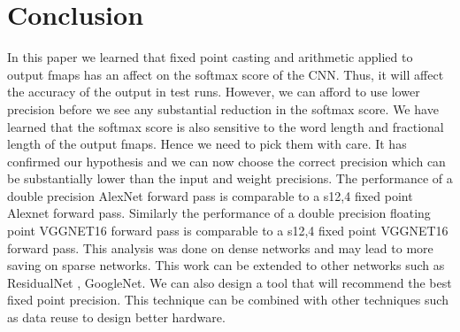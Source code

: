 \documentclass[conference]{IEEEtran}
\begin{document}


\section{Conclusion}
In this paper we learned that fixed point casting and arithmetic applied to output fmaps has an affect on the softmax score of the CNN. Thus, it will affect the accuracy of the output in test runs. However, we can afford to use lower precision before we see any substantial reduction in the softmax score. We have learned that the softmax score is also sensitive to the word length and fractional length of the output fmaps. Hence we need to pick them with care. It has confirmed our hypothesis and we can now choose the correct precision which can be substantially lower than the input and weight precisions. The performance of a double precision AlexNet forward pass is comparable to a s12,4 fixed point Alexnet forward pass. Similarly the performance of a double precision floating point VGGNET16 forward pass is comparable to a s12,4 fixed point VGGNET16 forward pass.
This analysis was done on dense networks and may lead to more saving on sparse networks. This work can be extended to other networks  such as ResidualNet , GoogleNet. We can also design a tool that will recommend the best fixed point precision. This technique can be combined with other techniques such as data reuse to design better hardware. 





%
%
%




\end{document}
